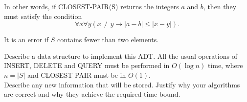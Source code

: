 \documentclass{article}
\begin{document}
\begin{enumerate}
\begin{description}
In other words, if CLOSEST-PAIR(S) returns the integers $a$ and $b$,
then they must satisfy the condition
$$\forall x \forall y ( x \neq y \rightarrow | a -b | \leq | x- y | ).$$

It is an error if $S$ contains fewer than two elements.
\end{description}

Describe a data structure to implement this ADT.  All the usual operations of INSERT, DELETE and QUERY 
must be performed in $O(\log n)$ time, where $n = |S|$ and CLOSEST-PAIR must be in $O(1)$.\\

Describe any new information that will be stored.
Justify why your 
algorithms are correct and why they achieve the required time bound.

\end{enumerate}
\end{document}
